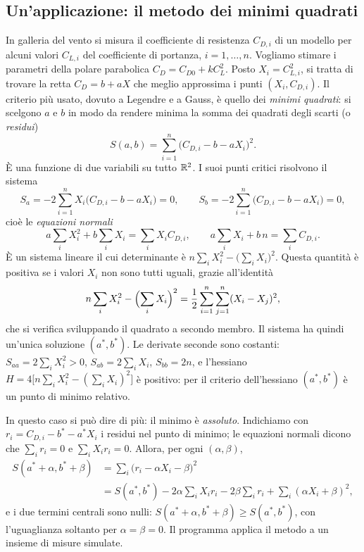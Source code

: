 \subsection{Un'applicazione: il metodo dei minimi quadrati}

In galleria del vento si misura il coefficiente di resistenza $C_{D,i}$ di un modello per
alcuni valori $C_{L,i}$ del coefficiente di portanza, $i=1,\dots,n$. Vogliamo stimare i
parametri della polare parabolica $C_{D}=C_{D0}+kC_{L}^{2}$. Posto $X_{i}=C_{L,i}^{2}$, si
tratta di trovare la retta $C_{D}=b+aX$ che meglio approssima i punti $(X_{i},C_{D,i})$.
Il criterio più usato, dovuto a Legendre e a Gauss, è quello dei \emph{minimi
quadrati}: si scelgono $a$ e $b$ in modo da rendere minima la somma dei quadrati degli
scarti (o \emph{residui})
\begin{equation}\label{eq:minimi-quadrati}
  S(a,b)=\sum_{i=1}^{n}\bigl(C_{D,i}-b-aX_{i}\bigr)^{2} .
\end{equation}
È una funzione di due variabili su tutto $\mathbb{R}^{2}$. I suoi punti critici risolvono il
sistema
\[
  S_{a}=-2\sum_{i=1}^{n}X_{i}\bigl(C_{D,i}-b-aX_{i}\bigr)=0, \qquad
  S_{b}=-2\sum_{i=1}^{n}\bigl(C_{D,i}-b-aX_{i}\bigr)=0,
\]
cioè le \emph{equazioni normali}
\begin{equation}\label{eq:equazioni-normali}
  a\sum_{i}X_{i}^{2}+b\sum_{i}X_{i}=\sum_{i}X_{i}C_{D,i}, \qquad
  a\sum_{i}X_{i}+b\,n=\sum_{i}C_{D,i} .
\end{equation}
È un sistema lineare il cui determinante è $n\sum_{i}X_{i}^{2}-\bigl(\sum_{i}X_{i}\bigr)^{2}$.
Questa quantità è positiva se i valori $X_{i}$ non sono tutti uguali, grazie all'identità
\begin{equation}\label{eq:identita-lagrange}
  n\sum_{i}X_{i}^{2}-\Bigl(\sum_{i}X_{i}\Bigr)^{2}=\frac12\sum_{i=1}^{n}\sum_{j=1}^{n}(X_{i}-X_{j})^{2},
\end{equation}
che si verifica sviluppando il quadrato a secondo membro. Il sistema ha quindi
un'unica soluzione $(a^{*},b^{*})$. Le derivate seconde sono costanti:
$S_{aa}=2\sum_{i}X_{i}^{2}>0$, $S_{ab}=2\sum_{i}X_{i}$, $S_{bb}=2n$, e l'hessiano
$H=4\bigl[n\sum_{i}X_{i}^{2}-(\sum_{i}X_{i})^{2}\bigr]$ è positivo: per il criterio
dell'hessiano $(a^{*},b^{*})$ è un punto di minimo relativo.

In questo caso si può dire di più: il minimo è \emph{assoluto}. Indichiamo con
$r_{i}=C_{D,i}-b^{*}-a^{*}X_{i}$ i residui nel punto di minimo; le equazioni normali dicono
che $\sum_{i}r_{i}=0$ e $\sum_{i}X_{i}r_{i}=0$. Allora, per ogni $(\alpha,\beta)$,
\begin{align*}
  S(a^{*}+\alpha,b^{*}+\beta)&=\sum_{i}\bigl(r_{i}-\alpha X_{i}-\beta\bigr)^{2}\\
  &=S(a^{*},b^{*})-2\alpha\sum_{i}X_{i}r_{i}-2\beta\sum_{i}r_{i}+\sum_{i}(\alpha X_{i}+\beta)^{2},
\end{align*}
e i due termini centrali sono nulli: $S(a^{*}+\alpha,b^{*}+\beta)\ge S(a^{*},b^{*})$, con
l'uguaglianza soltanto per $\alpha=\beta=0$. Il programma applica il metodo a un insieme
di misure simulate.

